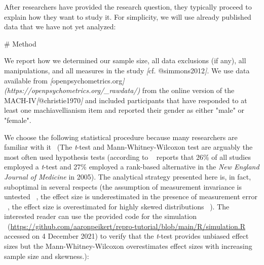 \documentclass[psych,tutorial,accept,moreauthors,pdftex]{Definitions/mdpi}
\newenvironment{Shaded}{\begin{snugshade}}{\end{snugshade}}
\newcommand{\CommentTok}[1]{\textcolor[rgb]{0.56,0.35,0.01}{\textit{#1}}}
\newcommand{\FunctionTok}[1]{\textcolor[rgb]{0.00,0.00,0.00}{#1}}
\newcommand{\NormalTok}[1]{#1}
\newcommand{\OtherTok}[1]{\textcolor[rgb]{0.56,0.35,0.01}{#1}}
\begin{document}
\begin{paracol}{2}
\switchcolumn


After researchers have provided the research question, they typically
proceed to explain how they want to study it. For simplicity, we will
use already published data that we have not yet analyzed:

\vspace{+6pt}
\end{paracol}
\nointerlineskip
\begin{adjustwidth}{0.5cm}{0cm} 
\begin{Shaded}
\begin{Highlighting}[]
\FunctionTok{\# Method}

\NormalTok{We report how we determined our sample size, all data exclusions (if any), all}
\NormalTok{manipulations, and all measures in the study }\CommentTok{[}\OtherTok{cf. @simmons2012}\CommentTok{]}\NormalTok{. We use data}
\NormalTok{available from }\CommentTok{[}\OtherTok{openpsychometrics.org}\CommentTok{](https://openpsychometrics.org/\_rawdata/)}
\NormalTok{from the online version of the MACH{-}IV}\CommentTok{[}\OtherTok{@christie1970}\CommentTok{]}\NormalTok{ and included participants}
\NormalTok{that have responded to at least one machiavellianism item and reported their}
\NormalTok{gender as either "male" or "female".}
\end{Highlighting}
\end{Shaded}
\end{adjustwidth}
\begin{paracol}{2}
\switchcolumn


We choose the following statistical procedure because many researchers
are familiar {with it}
~(The \emph{t}-test and Mann-Whitney-Wilcoxon test
  are arguably the most often used hypothesis tests (according to
 ~\citep{fagerlandTtestsNonparametricTests2012, hortonStatisticalMethodsJournal2005}
  reports that 26\% of all studies employed a \emph{t}-test and 27\% employed a
  rank-based alternative in the \emph{New England Journal of Medicine}
  in 2005). The analytical strategy presented here is, in fact,
  suboptimal in several respects (the assumption of measurement
  invariance is untested
 ~\citep{putnickMeasurementInvarianceConventions2016}, the effect size
  is underestimated in the presence of measurement error
 ~\citep{frostCorrectingRegressionDilution2000}, the effect size is
  overestimated for highly skewed distributions
 ~\citep{stonehouseRobustnessTestsCombined1998}). The interested reader
  can use the {provided code for the simulation}
~{(\url{https://github.com/aaronpeikert/repro-tutorial/blob/main/R/simulation.R} accessed on 4 December 2021)} to verify that the \emph{t}-test provides unbiased
  effect sizes but the Mann-Whitney-Wilcoxon overestimates effect sizes
  with increasing sample size and skewness.):

\vspace{+6pt}
\end{paracol}
\end{document}
